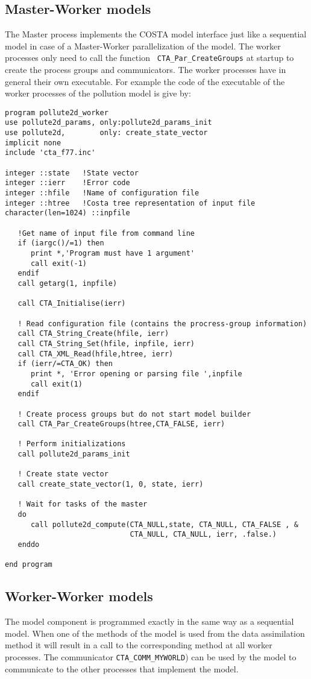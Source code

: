 \documentclass[a4paper,12pt]{article}
\newcommand{\styles}{../styles}
\begin{document}
\subsection{Master-Worker models}
The Master process implements the COSTA model interface just like a
sequential model in case of a Master-Worker parallelization of the model.
The worker processes only need to call the function {\tt
CTA\_Par\_CreateGroups} at startup to create the process groups and
communicators. The worker processes have in general their own executable.
For example the code of the executable of the worker processes of the
pollution model is give by:
\begin{verbatim}
program pollute2d_worker
use pollute2d_params, only:pollute2d_params_init
use pollute2d,        only: create_state_vector
implicit none
include 'cta_f77.inc'

integer ::state   !State vector
integer ::ierr    !Error code
integer ::hfile   !Name of configuration file
integer ::htree   !Costa tree representation of input file
character(len=1024) ::inpfile

   !Get name of input file from command line
   if (iargc()/=1) then
      print *,'Program must have 1 argument'
      call exit(-1)
   endif
   call getarg(1, inpfile)

   call CTA_Initialise(ierr)

   ! Read configuration file (contains the procress-group information)
   call CTA_String_Create(hfile, ierr)
   call CTA_String_Set(hfile, inpfile, ierr)
   call CTA_XML_Read(hfile,htree, ierr)
   if (ierr/=CTA_OK) then
      print *, 'Error opening or parsing file ',inpfile
      call exit(1)
   endif

   ! Create process groups but do not start model builder
   call CTA_Par_CreateGroups(htree,CTA_FALSE, ierr)

   ! Perform initializations
   call pollute2d_params_init

   ! Create state vector
   call create_state_vector(1, 0, state, ierr)

   ! Wait for tasks of the master
   do 
      call pollute2d_compute(CTA_NULL,state, CTA_NULL, CTA_FALSE , &
                             CTA_NULL, CTA_NULL, ierr, .false.)
   enddo

end program
\end{verbatim}


\subsection{Worker-Worker models}
The model component is programmed exactly in the same way as a sequential
model. When one of the methods of the model is used from the data
assimilation method it will result in a call to the corresponding method at
all worker processes. The communicator {\tt CTA\_COMM\_MYWORLD}) can be
used by the model to communicate to the other processes that implement the
model.

%
%
\end{document}
